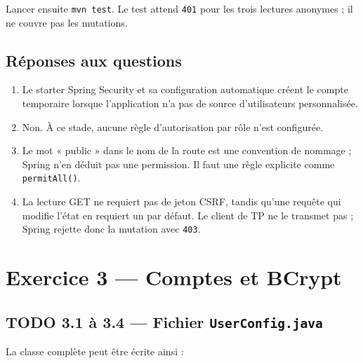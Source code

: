 \documentclass[11pt,a4paper]{article}
\begin{document}
Lancer ensuite \texttt{mvn test}. Le test attend \texttt{401} pour les trois lectures anonymes ; il ne couvre pas les mutations.

\subsection{Réponses aux questions}

\begin{enumerate}
\item Le starter Spring Security et sa configuration automatique créent le compte temporaire lorsque l’application n’a pas de source d’utilisateurs personnalisée.
\item Non. À ce stade, aucune règle d’autorisation par rôle n’est configurée.
\item Le mot « public » dans le nom de la route est une convention de nommage ; Spring n’en déduit pas une permission. Il faut une règle explicite comme \texttt{permitAll()}.
\item La lecture GET ne requiert pas de jeton CSRF, tandis qu’une requête qui modifie l’état en requiert un par défaut. Le client de TP ne le transmet pas ; Spring rejette donc la mutation avec \texttt{403}.
\end{enumerate}

\section{Exercice 3 — Comptes et BCrypt}

\subsection{TODO 3.1 à 3.4 — Fichier \texttt{UserConfig.java}}

La classe complète peut être écrite ainsi :
\end{document}
